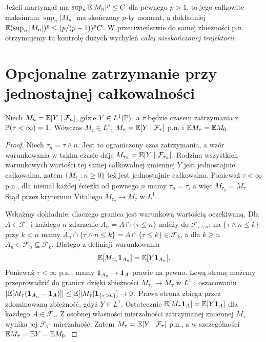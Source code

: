 \begin{przyklad}
Jeżeli martyngał ma $\sup_n\mathbb{E}|M_n|^p\leq C$
dla pewnego $p>1$, to jego całkowite
maksimum $\sup_n|M_n|$ ma skończony $p$-ty moment,
a dokładniej
$\mathbb{E}(\sup_n|M_n|)^p\leq(p/(p-1))^pC$.
W przeciwieństwie do samej zbieżności p.n.
otrzymujemy tu kontrolę dużych wychyleń
\emph{całej nieskończonej trajektorii}.
\end{przyklad}

\section{Opcjonalne zatrzymanie przy jednostajnej całkowalności}

\begin{twierdzenie}
Niech $M_n=\mathbb{E}[Y\mid\mathcal F_n]$, gdzie
$Y\in L^1(\mathbb{P})$, a $\tau$ będzie czasem
zatrzymania z $\mathbb{P}(\tau<\infty)=1$.
Wówczas $M_\tau\in L^1$,
$M_\tau=\mathbb{E}[Y\mid\mathcal F_\tau]$ p.n.
i $\mathbb{E} M_\tau=\mathbb{E} M_0$.
\end{twierdzenie}
\begin{proof}
Niech $\tau_n=\tau\wedge n$. Jest to ograniczony
czas zatrzymania, a wzór warunkowania w takim
czasie daje
$M_{\tau_n}=\mathbb{E}[Y\mid\mathcal F_{\tau_n}]$.
Rodzina wszystkich warunkowych wartości tej samej
całkowalnej zmiennej $Y$ jest jednostajnie
całkowalna, zatem $\{M_{\tau_n}:n\geq0\}$
też jest jednostajnie całkowalna.
Ponieważ $\tau<\infty$ p.n., dla niemal każdej
ścieżki od pewnego $n$ mamy $\tau_n=\tau$,
a więc $M_{\tau_n}=M_\tau$. Stąd przez kryterium
Vitaliego $M_{\tau_n}\to M_\tau$ w $L^1$.

Wskażmy dokładnie, dlaczego granica jest warunkową
wartością oczekiwaną. Dla $A\in\mathcal F_\tau$
i każdego $n$ zdarzenie
$A_n=A\cap\{\tau\leq n\}$ należy do
$\mathcal F_{\tau\wedge n}$:
na $\{\tau\wedge n\leq k\}$ przy $k<n$ mamy
$A_n\cap\{\tau\wedge n\leq k\}=A\cap\{\tau\leq k\}
\in\mathcal F_k$, a dla $k\geq n$
$A_n\in\mathcal F_n\subseteq\mathcal F_k$.
Dlatego z definicji warunkowania
\[
 \mathbb{E}[M_{\tau_n}\mathbf{1}_{A_n}]=\mathbb{E}[Y\mathbf{1}_{A_n}].
\]
Ponieważ $\tau<\infty$ p.n., mamy
$\mathbf{1}_{A_n}\to\mathbf{1}_{A}$ prawie na pewno.
Lewą stronę możemy przeprowadzić do granicy
dzięki zbieżności $M_{\tau_n}\to M_\tau$ w $L^1$
i oszacowaniu
$|\mathbb{E}[M_\tau(\mathbf{1}_{A_n}-\mathbf{1}_{A})]|
\leq\mathbb{E}[|M_\tau|\mathbf{1}_{\{\tau>n\}}]\to0$.
Prawa strona zbiega przez zdominowaną zbieżność,
gdyż $Y\in L^1$. Ostatecznie
$\mathbb{E}[M_\tau\mathbf{1}_{A}]=\mathbb{E}[Y\mathbf{1}_{A}]$
dla każdego $A\in\mathcal F_\tau$.
Z osobnej własności mierzalności zatrzymanej
zmiennej $M_\tau$ wynika jej $\mathcal F_\tau$-
mierzalność. Zatem
$M_\tau=\mathbb{E}[Y\mid\mathcal F_\tau]$ p.n., a
w szczególności $\mathbb{E} M_\tau=\mathbb{E} Y=\mathbb{E} M_0$.
\end{proof}

